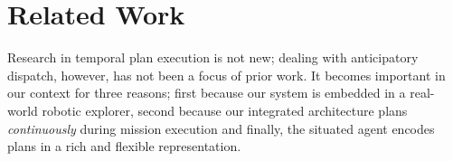 \section{Related Work}
\label{sec:related}


Research in temporal plan execution is not new; dealing with
anticipatory dispatch, however, has not been a focus of prior work. It
becomes important in our context for three reasons; first because our
system is embedded in a real-world robotic explorer, second because
our integrated architecture \rx \cite{mcgann08bdup,py10dup,rajan12dup}
plans \emph{continuously} during mission execution and finally, the
situated agent encodes plans in a rich and flexible representation.



